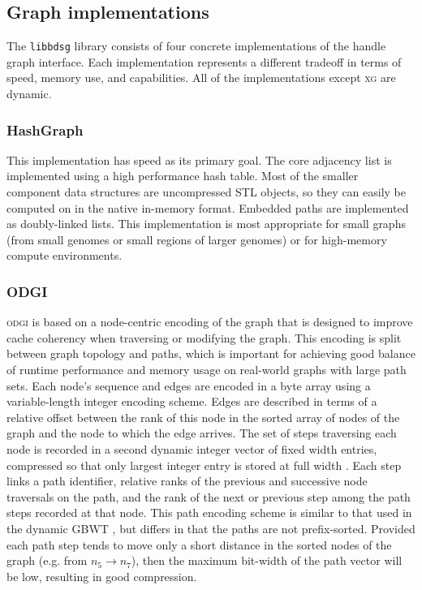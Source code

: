 \documentclass{article}
\begin{document}
\subsection{Graph implementations}

The \texttt{libbdsg} library consists of four concrete implementations of the handle graph interface.
Each implementation represents a different tradeoff in terms of speed, memory use, and capabilities.
All of the implementations except \textsc{xg} are dynamic. 

\subsubsection{HashGraph}

This implementation has speed as its primary goal.
The core adjacency list is implemented using a high performance hash table.
Most of the smaller component data structures are uncompressed STL objects, so they can easily be computed on in the native in-memory format.
Embedded paths are implemented as doubly-linked lists.
This implementation is most appropriate for small graphs (from small genomes or small regions of larger genomes) or for high-memory compute environments.

\subsubsection{ODGI}

\textsc{odgi} is based on a node-centric encoding of the graph that is designed to improve cache coherency when traversing or modifying the graph.
This encoding is split between graph topology and paths, which is important for achieving good balance of runtime performance and memory usage on real-world graphs with large path sets.
Each node's sequence and edges are encoded in a byte array using a variable-length integer encoding scheme.
Edges are described in terms of a relative offset between the rank of this node in the sorted array of nodes of the graph and the node to which the edge arrives.
The set of steps traversing each node is recorded in a second dynamic integer vector of fixed width entries, compressed so that only largest integer entry is stored at full width \cite{prezza2017framework}.
Each step links a path identifier, relative ranks of the previous and successive node traversals on the path, and the rank of the next or previous step among the path steps recorded at that node.
This path encoding scheme is similar to that used in the dynamic GBWT \cite{Siren_2019}, but differs in that the paths are not prefix-sorted.
Provided each path step tends to move only a short distance in the sorted nodes of the graph (e.g. from $n_{5} \to n_{7}$), then the maximum bit-width of the path vector will be low, resulting in good compression.
\end{document}
